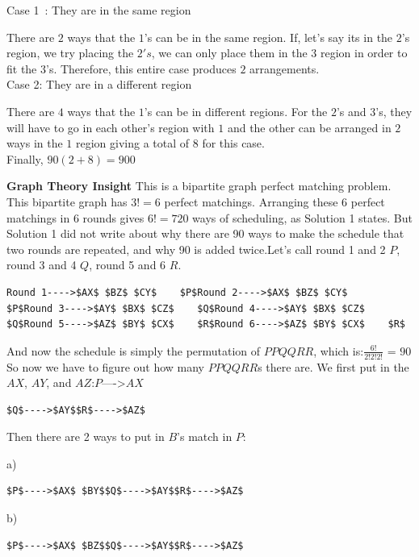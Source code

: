 \begin{enumerate}
 Case 1 : They are in the same region

 There are $2$ ways that the $1$'s can be in the same region. If, let's say its in the $2$'s region, we try placing the $2's$, we can only place them in the $3$ region in order to fit the $3$'s. Therefore, this entire case produces $2$ arrangements. \\

 Case 2: They are in a different region 

 There are $4$ ways that the $1$'s can be in different regions. For the $2$'s and $3$'s, they will have to go in each other's region with $1$ and the other can be arranged in $2$ ways in the $1$ region giving a total of $8$ for this case.\\

 Finally, $90(2+8) = 900$

 \textbf{Graph Theory Insight} This is a bipartite graph perfect matching problem.  This bipartite graph has $3!=6$ perfect matchings.  Arranging these 6 perfect matchings in 6 rounds gives $6!=720$ ways of scheduling, as Solution 1 states. But Solution 1 did not write about why there are 90 ways to make the schedule that two rounds are repeated, and why 90 is added twice.Let's call round 1 and 2  $P$, round 3 and 4  $Q$, round 5 and 6  $R$.

 \begin{verbatim}
Round 1---->$AX$ $BZ$ $CY$    $P$Round 2---->$AX$ $BZ$ $CY$    $P$Round 3---->$AY$ $BX$ $CZ$    $Q$Round 4---->$AY$ $BX$ $CZ$    $Q$Round 5---->$AZ$ $BY$ $CX$    $R$Round 6---->$AZ$ $BY$ $CX$    $R$
\end{verbatim}

And now the schedule is simply the permutation of $PPQQRR$, which is:$\frac{6!}{2!2!2!}$ = $90$So now we have to figure out how many $PPQQRR$s there are. We first put in the $AX$, $AY$, and $AZ$:$P$---->$AX$
\begin{verbatim}
$Q$---->$AY$$R$---->$AZ$
\end{verbatim}

Then there are 2 ways to put in $B$'s match in $P$:

 a)

 \begin{verbatim}
$P$---->$AX$ $BY$$Q$---->$AY$$R$---->$AZ$
\end{verbatim}

b)

 \begin{verbatim}
$P$---->$AX$ $BZ$$Q$---->$AY$$R$---->$AZ$
\end{verbatim}


\end{enumerate}
